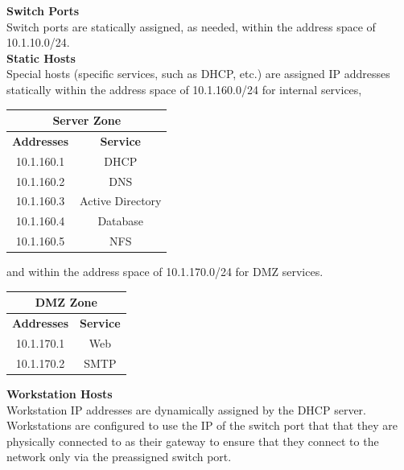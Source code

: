 \noindent
\textbf{Switch Ports} \\
Switch ports are statically assigned, as needed, within the address space of 
10.1.10.0/24. \\

\noindent
\textbf{Static Hosts} \\
Special hosts (specific services, such as DHCP, etc.) are assigned IP addresses 
statically within the address space of 10.1.160.0/24 for internal services, \\

\begin{center}
	\begin{tabular}[m]{| c | c |}
		\hline
		\multicolumn{2}{|c|}{Server Zone}\\
		\hline
		\textbf{Addresses} & \textbf{Service}\\
		\hline
		10.1.160.1 & DHCP \\
		\hline
		10.1.160.2 & DNS \\
		\hline
		10.1.160.3 & Active Directory \\
		\hline
		10.1.160.4 & Database \\
		\hline
		10.1.160.5 & NFS \\
		\hline
	\end{tabular}
\end{center}

\vspace{1em}

and within the address space of 10.1.170.0/24 for DMZ services. \\

\begin{center}
	\begin{tabular}[m]{| c | c |}
		\hline
		\multicolumn{2}{|c|}{DMZ Zone}\\
		\hline
		\textbf{Addresses} & \textbf{Service}\\
		\hline
		10.1.170.1 & Web \\
		\hline
		10.1.170.2 & SMTP \\
		\hline
	\end{tabular}
\end{center}

\vspace{1em}

\noindent
\textbf{Workstation Hosts} \\
Workstation IP addresses are dynamically assigned by the DHCP server. 
Workstations are configured to use the IP of the switch port that that they are
physically connected to as their gateway to ensure that they connect to the 
network only via the preassigned switch port. \\

